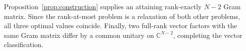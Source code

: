 Proposition~\ref{prop:construction} supplies an attaining rank-exactly
$N-2$ Gram matrix. Since the rank-at-most problem is a relaxation of
both other problems, all three optimal values coincide. Finally, two
full-rank vector factors with the same Gram matrix differ by a common
unitary on $\mathbb C^{N-2}$, completing the vector classification.
